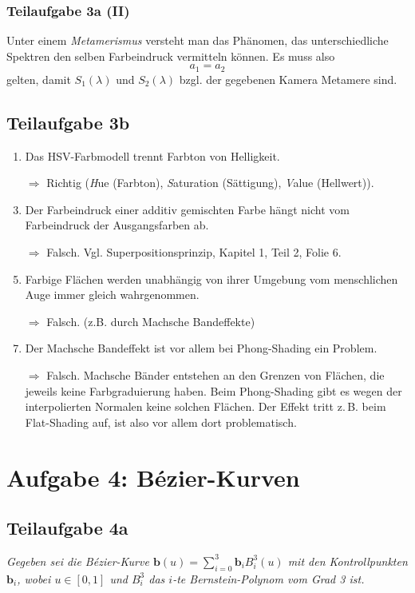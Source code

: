 \documentclass[a4paper]{scrartcl}
\begin{document}
\subsubsection*{Teilaufgabe 3a (II)}
Unter einem \textit{Metamerismus} versteht man das Phänomen, das
unterschiedliche Spektren den selben Farbeindruck vermitteln können. Es muss
also
\[a_1 = a_2\]
gelten, damit $S_1(\lambda)$ und $S_2(\lambda)$ bzgl. der gegebenen Kamera
Metamere sind.

\subsection*{Teilaufgabe 3b}
\begin{enumerate}
    \item Das HSV-Farbmodell trennt Farbton von Helligkeit.
    \item[$\Rightarrow$] Richtig (\textit{H}ue (Farbton), \textit{S}aturation (Sättigung),
                         \textit{V}alue (Hellwert)).
    \item Der Farbeindruck einer additiv gemischten Farbe hängt nicht vom Farbeindruck der Ausgangsfarben ab.
    \item[$\Rightarrow$] Falsch. Vgl. Superpositionsprinzip, Kapitel 1, Teil 2, Folie 6.
    \item Farbige Flächen werden unabhängig von ihrer Umgebung vom menschlichen Auge immer gleich wahrgenommen.
    \item[$\Rightarrow$] Falsch. (z.B. durch Machsche Bandeffekte)
    \item Der Machsche Bandeffekt ist vor allem bei Phong-Shading ein Problem.
    \item[$\Rightarrow$] Falsch. Machsche Bänder entstehen an den Grenzen von Flächen, die jeweils keine Farbgraduierung haben. Beim Phong-Shading gibt es wegen der interpolierten Normalen keine solchen Flächen. Der Effekt tritt z.\,B. beim Flat-Shading auf, ist also vor allem dort problematisch. 
\end{enumerate}

\clearpage
\section*{Aufgabe 4: Bézier-Kurven}
\subsection*{Teilaufgabe 4a}
\textit{Gegeben sei die Bézier-Kurve $\mathbf{b}(u) = \sum_{i=0}^3 \mathbf{b}_i B_i^3(u)$ mit den Kontrollpunkten $\mathbf{b}_i$, wobei
$u \in [0, 1]$ und $B_i^3$ das $i$-te Bernstein-Polynom vom Grad 3 ist.}
\end{document}
